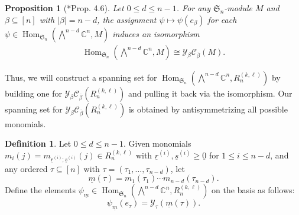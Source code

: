 \documentclass[11pt, reqno]{amsart}
\newtheorem{proposition}[theorem]{Proposition}
\theoremstyle{definition}
\newtheorem{definition}[theorem]{Definition}
\theoremstyle{remark}
\numberwithin{equation}{section}
\newcommand{\0}{\emptyset}
\newcommand{\C}{\mathbb{C}}
\renewcommand{\S}{\mathfrak{S}}
\newcommand{\cC}{\mathcal{C}}
\newcommand{\cY}{\mathcal{Y}}
\newcommand{\m}{\underline{m}}
\renewcommand{\r}{\underline{r}}
\newcommand{\s}{\underline{s}}
\DeclareMathOperator{\Hom}{Hom}
\begin{document}
\begin{proposition}[\cite{GLM}*{Prop. 4.6}]
\label{prop:hook-hom-iso} Let $0\leq d \leq n-1$.
    For any $\mathfrak{S}_n$-module $M$ and $\beta \subseteq [n]$ with $|\beta|=n-d$, the assignment $\psi \mapsto \psi(e_\beta)$ for each $\psi \in \Hom_{\S_n}\left(\bigwedge\nolimits^{n-d}\C^n, M\right)$ induces an isomorphism
    \begin{align*}
\Hom_{\S_n}\left(\bigwedge\nolimits^{n-d}\C^n, M\right) \cong \cY_{\beta} \cC_{\overline{\beta}}(M).
    \end{align*}
\end{proposition}
Thus, we will construct a spanning set for $\Hom_{\S_n}\left(\bigwedge^{n-d}\C^n, R_n^{(k,\ell)}\right)$ by building one for $\cY_{\beta} \cC_{\overline{\beta}}\left(R_n^{(k,\ell)}\right)$ and pulling it back via the isomorphism. 
Our spanning set for $\cY_{\beta} \cC_{\overline{\beta}}\left(R_n^{(k,\ell)}\right)$ is  obtained by antisymmetrizing all possible monomials. 

\begin{definition}  Let $0\leq d \leq n-1$.
    Given monomials $m_i(j) = m_{\r^{(i)};\s^{(i)}}(j) \in R_n^{(k,\ell)}$ with $\r^{(i)},\s^{(i)}\geq \underline{0}$ for $1\leq i\leq n-d$, and any ordered $\tau \subseteq [n]$ with $\tau =(\tau_1,\dots,\tau_{n-d})$, let 
    \[\m(\tau) = m_1(\tau_1) \cdots m_{n-d}(\tau_{n-d}).\]
    Define the elements $\psi_{\m} \in \Hom_{\S_n}\left(\bigwedge^{n-d} \C^n, R_n^{(k,\ell)}\right)$ on the basis as follows:
    \[
    \psi_{\m}(e_\tau) = \cY_\tau(\m(\tau)). 
    \]
\end{definition}
\end{document}
